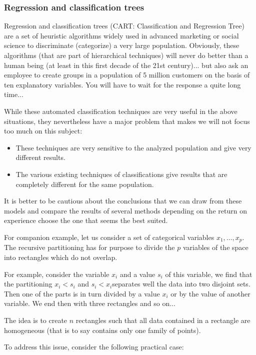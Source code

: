 	\pagebreak
	\subsubsection{Regression and classification trees}
	Regression and classification trees (CART: Classification and Regression Tree) are a set of heuristic algorithms widely used in advanced marketing or social science to discriminate (categorize) a very large population. Obviously, these algorithms (that are part of hierarchical techniques) will never do better than a human being (at least in this first decade of the 21st century)... but also ask an employee to create groups in a population of 5 million customers on the basis of ten explanatory variables. You will have to wait for the response a quite long time...
	
	While these automated  classification techniques are very useful in the above situations, they nevertheless have a major problem that makes we will not focus too much on this subject:
	\begin{itemize}
		\item These techniques are very sensitive to the analyzed population and give very different results.

		\item The various existing  techniques of classifications give results that are completely different for the same population.
	\end{itemize}
	It is better to be cautious about the conclusions that we can draw from these models and compare the results of several methods depending on the return on experience choose the one that seems the best suited.

	For companion example, let us consider a set of categorical variables $x_1,\ldots,x_p$. The recursive partitioning has for purpose to divide the $p$ variables of the space into rectangles which do not overlap.
	
	For example, consider the variable $x_i$ and a value $s_i$ of this variable, we find that the partitioning $x_i<s_i$ and $s_i<x_i$separates well the data into two disjoint sets. Then one of the parts is in turn divided by a value $x_i$ or by the value of another variable. We end then with three rectangles and so on...
	
	The idea is to create $n$ rectangles such that all data contained in a rectangle are homogeneous (that is to say contains only one family of points).

	To address this issue, consider the following practical case:
	
